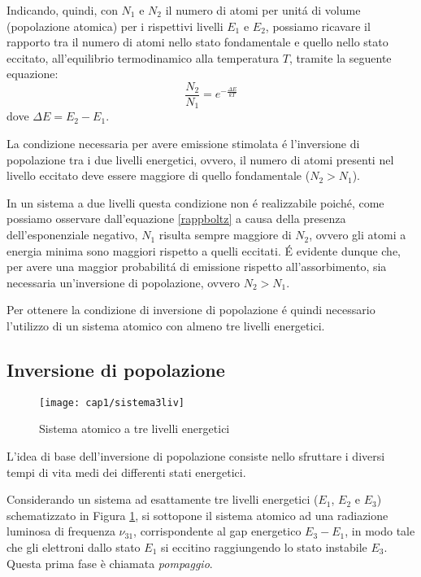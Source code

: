  Indicando, quindi, con $N_1$ e $N_2$ il numero di atomi per unit\'a di volume (popolazione atomica) per i rispettivi livelli $E_1$ e $E_2$, possiamo ricavare il rapporto tra il numero di atomi nello stato fondamentale e quello nello stato eccitato, all'equilibrio termodinamico alla temperatura $T$, tramite la seguente equazione:
\begin{equation}
	\frac{N_2}{N_1}=e^{-\frac{\Delta E}{kT}} 
	\label{rappboltz}
\end{equation}
dove $\Delta E = E_2 - E_1$.

La condizione necessaria per avere emissione stimolata \'e l'inversione di popolazione tra i due livelli energetici, ovvero, il numero di atomi presenti nel livello eccitato deve essere maggiore di quello fondamentale ($N_2 > N_1$).

In un sistema a due livelli questa condizione non \'e realizzabile poich\'e, come possiamo osservare dall'equazione \ref{rappboltz} a causa della presenza dell'esponenziale negativo, $N_1$ risulta sempre maggiore di $N_2$, ovvero gli atomi a energia minima sono maggiori rispetto a quelli eccitati. 
\'E evidente dunque che, per avere una maggior probabilit\'a di emissione rispetto all'assorbimento, sia necessaria un'inversione di popolazione, ovvero $N_2 > N_1$.

Per ottenere la condizione di inversione di popolazione \'e quindi necessario l'utilizzo di un sistema atomico con almeno tre livelli energetici.

\subsection{Inversione di popolazione}
\begin{figure}[H]
  \begin{center}
    \texttt{[image: cap1/sistema3liv]}
    \caption{Sistema atomico a tre livelli energetici}
    \label{sistema3liv}
  \end{center}
\end{figure}
L'idea di base dell'inversione di popolazione consiste nello sfruttare i diversi tempi di vita medi dei differenti stati energetici.

Considerando un sistema ad esattamente tre livelli energetici ($E_1$, $E_2$ e $E_3$) schematizzato in Figura \ref{sistema3liv}, si sottopone il sistema atomico ad una radiazione luminosa di frequenza $\nu_{31}$, corrispondente al gap energetico $E_3-E_1$, in modo tale che gli elettroni dallo stato $E_1$ si eccitino raggiungendo lo stato instabile $E_3$. Questa prima fase è chiamata \emph{pompaggio}.

